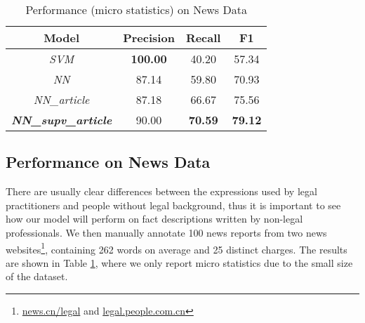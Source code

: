 \begin{table}
\centering
\small{
\begin{tabular}{|c|c|c|c|}
\hline
\textbf{Model}												& \textbf{Precision} 				& \textbf{Recall} 				& \textbf{F1} 	\\
\hline
\textit{SVM} 													& \textbf{100.00}						& 40.20  									& 57.34 				 	\\
\hline
\textit{NN}														& 87.14											& 59.80 									& 70.93					\\
\hline
\textit{NN\_article}					& 87.18											& 66.67 									& 75.56					\\
\hline
\textbf{\textit{NN\_supv\_article}} 	& 90.00 										& \textbf{70.59} 					& \textbf{79.12} 		 	\\
\hline
\end{tabular}
}
\caption{Performance (micro statistics) on News Data}
\label{tabble_news_results}
\end{table}

\subsection{Performance on News Data}
There are usually 
clear %
differences between the expressions used by legal practitioners and people without legal background, 
thus it is important to see how our model will perform on fact descriptions written by non-legal professionals.
%
We then manually annotate 100 news reports %
from two news websites\footnote{\url{news.cn/legal} and \url{legal.people.com.cn}},
containing 262 words on average and 25 distinct charges.
%
The results are shown in Table \ref{tabble_news_results}, where we only report micro statistics due to 
the small size of the dataset.


